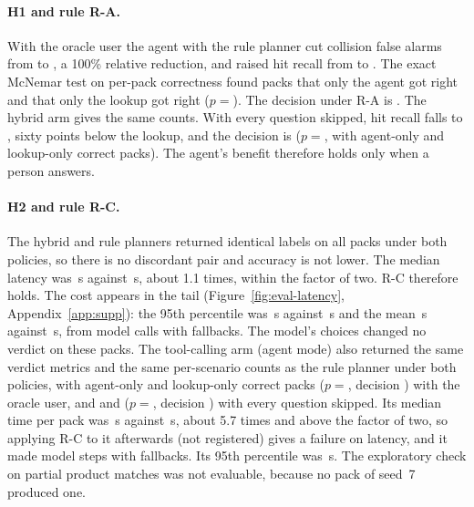 \paragraph{H1 and rule R-A.} With the oracle user the agent with the rule planner cut collision false
alarms from  to , a 100\% relative
reduction, and raised hit recall from  to .
The exact McNemar test on per-pack correctness found  packs that only the
agent got right and  that only the lookup got right
($p={}$). The decision under R-A is \textbf{}.
The hybrid arm gives the same counts. With every question skipped, hit recall falls to
, sixty points below the lookup, and the decision is
 ($p={}$, with 
agent-only and  lookup-only correct packs). The agent's benefit therefore
holds only when a person answers.

\paragraph{H2 and rule R-C.} The hybrid and rule planners returned identical labels on all
 packs under both policies, so there is no discordant pair and accuracy is not lower. The
median latency was \,s against \,s, about
1.1 times, within the factor of two. R-C therefore holds. The cost appears in the tail
(Figure~\ref{fig:eval-latency}, Appendix~\ref{app:supp}): the 95th percentile was \,s
against \,s and the mean \,s against
\,s, from  model calls with
 fallbacks. The model's choices changed no verdict on these packs.
The tool-calling arm (agent mode) also returned the same verdict metrics and the same per-scenario counts as the rule
planner under both policies, with  agent-only and  lookup-only correct packs
($p={}$, decision ) with the oracle user, and  and
 ($p={}$, decision ) with every question skipped.
Its median time per pack was \,s against \,s, about 5.7 times and above the
factor of two, so applying R-C to it afterwards (not registered) gives a failure on latency, and it
made  model steps with  fallbacks. Its 95th percentile was
\,s. The exploratory check on
partial product matches was not evaluable, because no pack of seed~7 produced one.

